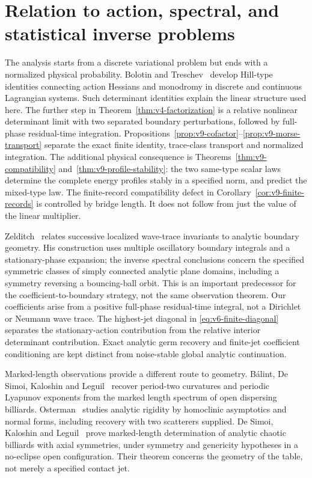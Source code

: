 \section{Relation to action, spectral, and statistical inverse problems}
\label{sec:v5-comparison}
The analysis starts from a discrete variational problem but ends with a
normalized physical probability. Bolotin and Treschev~\cite{Hill} develop
Hill-type identities connecting action Hessians and monodromy in discrete
and continuous Lagrangian systems. Such determinant identities explain
the linear structure used here. The further step in
Theorem~\ref{thm:v4-factorization} is a relative nonlinear determinant
limit with two separated boundary perturbations, followed by full-phase
residual-time integration. Propositions~\ref{prop:v9-cofactor}--\ref{prop:v9-morse-transport}
separate the exact finite identity, trace-class transport and
normalized integration. The additional physical consequence is
Theorems~\ref{thm:v9-compatibility} and~\ref{thm:v9-profile-stability}:
the two same-type scalar laws determine the complete energy profiles
stably in a specified norm, and predict the mixed-type law.
The finite-record compatibility defect in
Corollary~\ref{cor:v9-finite-records} is controlled by bridge length.
It does not follow from just the value of the linear multiplier.

Zelditch~\cite{Zelditch} relates successive localized wave-trace
invariants to analytic boundary geometry. His construction uses
multiple oscillatory boundary integrals and a stationary-phase expansion;
the inverse spectral conclusions concern the specified symmetric classes
of simply connected analytic plane domains, including a symmetry
reversing a bouncing-ball orbit. This is an important predecessor for
the coefficient-to-boundary strategy, not the same observation theorem.
Our coefficients arise from a positive full-phase residual-time integral,
not a Dirichlet or Neumann wave trace. The highest-jet diagonal in
\eqref{eq:v6-finite-diagonal} separates the stationary-action contribution
from the relative interior determinant contribution. Exact analytic germ
recovery and finite-jet coefficient conditioning are kept distinct from
noise-stable global analytic continuation.

Marked-length observations provide a different route to geometry.
B\'alint, De Simoi, Kaloshin and Leguil~\cite{BDKL} recover period-two
curvatures and periodic Lyapunov exponents from the marked length
spectrum of open dispersing billiards. Osterman~\cite{Osterman} studies
analytic rigidity by homoclinic asymptotics and normal forms, including
recovery with two scatterers supplied. De Simoi, Kaloshin and
Leguil~\cite{DSKL} prove marked-length determination of analytic chaotic
billiards with axial symmetries, under symmetry and genericity hypotheses
in a no-eclipse open configuration. Their theorem concerns the geometry
of the table, not merely a specified contact jet.

